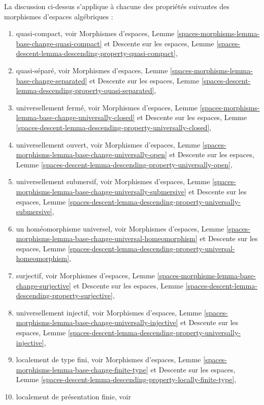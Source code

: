 \medskip\noindent
La discussion ci-dessus s'applique à chacune des propriétés suivantes des
morphismes d'espaces algébriques :
\begin{enumerate}
\item quasi-compact, voir
Morphismes d'espaces,
Lemme \ref{spaces-morphisms-lemma-base-change-quasi-compact}
et
Descente sur les espaces,
Lemme \ref{spaces-descent-lemma-descending-property-quasi-compact},
\item quasi-séparé, voir
Morphismes d'espaces,
Lemme \ref{spaces-morphisms-lemma-base-change-separated}
et
Descente sur les espaces,
Lemme \ref{spaces-descent-lemma-descending-property-quasi-separated},
\item universellement fermé, voir
Morphismes d'espaces,
Lemme \ref{spaces-morphisms-lemma-base-change-universally-closed}
et
Descente sur les espaces,
Lemme \ref{spaces-descent-lemma-descending-property-universally-closed},
\item universellement ouvert, voir
Morphismes d'espaces,
Lemme \ref{spaces-morphisms-lemma-base-change-universally-open}
et
Descente sur les espaces,
Lemme \ref{spaces-descent-lemma-descending-property-universally-open},
\item universellement submersif, voir
Morphismes d'espaces,
Lemme \ref{spaces-morphisms-lemma-base-change-universally-submersive}
et
Descente sur les espaces,
Lemme \ref{spaces-descent-lemma-descending-property-universally-submersive},
\item un homéomorphisme universel, voir
Morphismes d'espaces,
Lemme \ref{spaces-morphisms-lemma-base-change-universal-homeomorphism}
et
Descente sur les espaces,
Lemme \ref{spaces-descent-lemma-descending-property-universal-homeomorphism},
\item surjectif, voir
Morphismes d'espaces,
Lemme \ref{spaces-morphisms-lemma-base-change-surjective}
et
Descente sur les espaces,
Lemme \ref{spaces-descent-lemma-descending-property-surjective},
\item universellement injectif, voir
Morphismes d'espaces,
Lemme \ref{spaces-morphisms-lemma-base-change-universally-injective}
et
Descente sur les espaces,
Lemme \ref{spaces-descent-lemma-descending-property-universally-injective},
\item localement de type fini, voir
Morphismes d'espaces,
Lemme \ref{spaces-morphisms-lemma-base-change-finite-type}
et
Descente sur les espaces,
Lemme \ref{spaces-descent-lemma-descending-property-locally-finite-type},
\item localement de présentation finie, voir

\end{enumerate}
